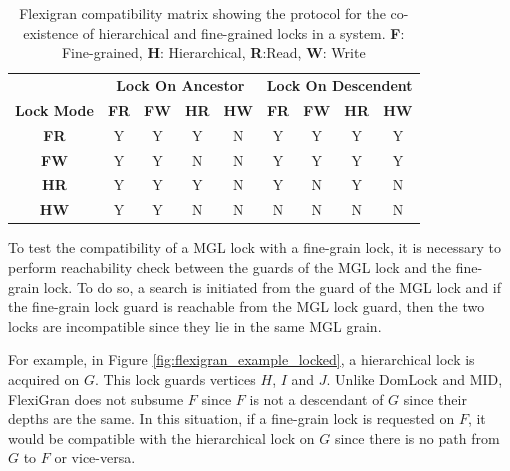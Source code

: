 \begin{table}[h]
    \centering
    \captionsetup{justification=centering}
    \begin{tabular}{c|cccc|cccc|}
        \multicolumn{1}{c}{} & \multicolumn{4}{c|}{\textbf{Lock On Ancestor}} & \multicolumn{4}{c}{\textbf{Lock On Descendent}} \\
        \cline{2-9}
        \textbf{Lock Mode} & \textbf{FR} & \textbf{FW} & \textbf{HR} & \textbf{HW} & \textbf{FR} & \textbf{FW} & \textbf{HR} & \textbf{HW} \\
        \hline
        \textbf{FR} & \cellcolor{green!25} Y & \cellcolor{green!25} Y & \cellcolor{green!25} Y & \cellcolor{red!25} N & \cellcolor{green!25} Y & \cellcolor{green!25} Y & \cellcolor{green!25} Y & \cellcolor{green!25} Y \\
        \textbf{FW} & \cellcolor{green!25} Y & \cellcolor{green!25} Y & \cellcolor{red!25} N & \cellcolor{red!25} N & \cellcolor{green!25} Y & \cellcolor{green!25} Y & \cellcolor{green!25} Y & \cellcolor{green!25} Y \\
        \textbf{HR} & \cellcolor{green!25} Y & \cellcolor{green!25} Y & \cellcolor{green!25} Y & \cellcolor{red!25} N & \cellcolor{green!25} Y & \cellcolor{red!25} N & \cellcolor{green!25} Y & \cellcolor{red!25} N \\
        \textbf{HW} & \cellcolor{green!25} Y & \cellcolor{green!25} Y & \cellcolor{red!25} N & \cellcolor{red!25} N & \cellcolor{red!25} N & \cellcolor{red!25} N & \cellcolor{red!25} N & \cellcolor{red!25} N \\
    \end{tabular}
    \caption{Flexigran compatibility matrix showing the protocol for the co-existence of hierarchical and fine-grained locks in a system. \textbf{F}: Fine-grained, \textbf{H}: Hierarchical, \textbf{R}:Read, \textbf{W}: Write}
    \label{tab:flexigran_locks}
\end{table}

To test the compatibility of a MGL lock with a fine-grain lock, it is necessary to perform reachability check between the guards of the MGL lock and the fine-grain lock. To do so, a search is initiated from the guard of the MGL lock and if the fine-grain lock guard is reachable from the MGL lock guard, then the two locks are incompatible since they lie in the same MGL grain. 

For example, in Figure \ref{fig:flexigran_example_locked}, a hierarchical lock is acquired on $G$. This lock guards vertices $H$, $I$ and $J$. Unlike DomLock and MID, FlexiGran does not subsume $F$ since $F$ is not a descendant of $G$ since their depths are the same. In this situation, if a fine-grain lock is requested on $F$, it would be compatible with the hierarchical lock on $G$ since there is no path from $G$ to $F$ or vice-versa.

